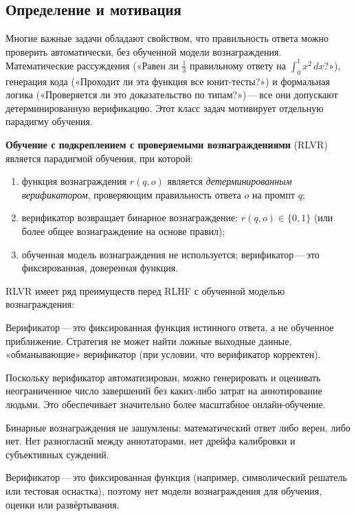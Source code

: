 \subsection{Определение и мотивация}

Многие важные задачи обладают свойством, что правильность ответа можно проверить автоматически, без обученной модели вознаграждения. Математические рассуждения («Равен ли $\frac{1}{3}$ правильному ответу на $\int_0^1 x^2\,dx$?»), генерация кода («Проходит ли эта функция все юнит-тесты?») и формальная логика («Проверяется ли это доказательство по типам?»)\,---\,все они допускают детерминированную верификацию. Этот класс задач мотивирует отдельную парадигму обучения.

\begin{definition}[RLVR]
\label{def:rlvr}
\textbf{Обучение с подкреплением с проверяемыми вознаграждениями} (RLVR) является парадигмой обучения, при которой:
\begin{enumerate}[leftmargin=*]
  \item функция вознаграждения $r(q, o)$ является \emph{детерминированным верификатором}, проверяющим правильность ответа $o$ на промпт $q$;
  \item верификатор возвращает бинарное вознаграждение: $r(q, o) \in \{0, 1\}$ (или более общее вознаграждение на основе правил);
  \item обученная модель вознаграждения не используется; верификатор\,---\,это фиксированная, доверенная функция.
\end{enumerate}
\end{definition}

RLVR имеет ряд преимуществ перед RLHF с обученной моделью вознаграждения:
\begin{description}[leftmargin=!,labelwidth=3.5cm]
  \item[Нет взлома вознаграждения] Верификатор\,---\,это фиксированная функция истинного ответа, а не обученное приближение. Стратегия не может найти ложные выходные данные, «обманывающие» верификатор (при условии, что верификатор корректен).
  \item[Неограниченные данные] Поскольку верификатор автоматизирован, можно генерировать и оценивать неограниченное число завершений без каких-либо затрат на аннотирование людьми. Это обеспечивает значительно более масштабное онлайн-обучение.
  \item[Чистый сигнал] Бинарные вознаграждения не зашумлены: математический ответ либо верен, либо нет. Нет разногласий между аннотаторами, нет дрейфа калибровки и субъективных суждений.
  \item[Нет обучения модели вознаграждения] Верификатор\,---\,это фиксированная функция (например, символический решатель или тестовая оснастка), поэтому нет модели вознаграждения для обучения, оценки или развёртывания.
\end{description}

